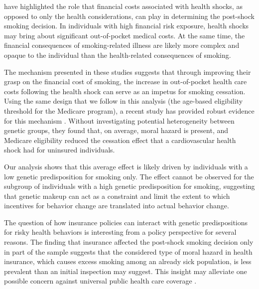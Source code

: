 \documentclass[11pt]{article}
\begin{document}
\cite{Richards2014,Marti2017} have highlighted the role that financial costs associated with health shocks, as opposed to only the health considerations, can play in determining the post-shock smoking decision.
In individuals with high financial risk exposure, health shocks may bring about significant out-of-pocket medical costs.
At the same time, the financial consequences of smoking-related illness are likely more complex and opaque to the individual than the health-related consequences of smoking.

The mechanism presented in these studies suggests that through improving their grasp on the financial cost of smoking, the increase in out-of-pocket health care costs following the health shock can serve as an impetus for smoking cessation.
Using the same design that we follow in this analysis (the age-based eligibility threshold for the Medicare program), a recent study has provided robust evidence for this mechanism \citep{Marti2017}.
Without investigating potential heterogeneity between genetic groups, they found that, on average, moral hazard is present, and Medicare eligibility reduced the cessation effect that a cardiovascular health shock had for uninsured individuals.

Our analysis shows that this average effect is likely driven by individuals with a low genetic predisposition for smoking only.
The effect cannot be observed for the subgroup of individuals with a high genetic predisposition for smoking, suggesting that genetic makeup can act as a constraint and limit the extent to which incentives for behavior change are translated into actual behavior change.
%
%

The question of how insurance policies can interact with genetic predispositions for risky health behaviors is interesting from a policy perspective for several reasons. The finding that insurance affected the post-shock smoking decision only in part of the sample suggests that the considered type of moral hazard in health insurance, which causes excess smoking among an already sick population, is less prevalent than an initial inspection may suggest.
This insight may alleviate one possible concern against universal public health care coverage \citep{Mendoza2016,Einav2018}.
\end{document}
